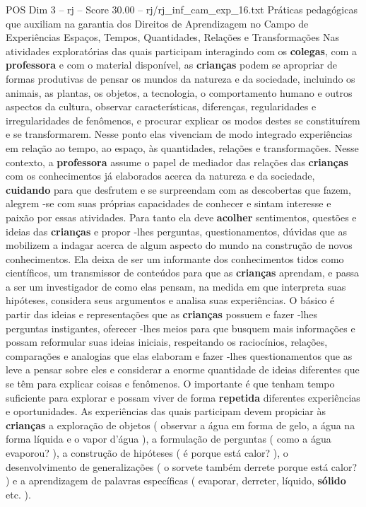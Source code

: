 \begin{textsample}{POS Dim 3 – rj – Score 30.00 – rj/rj\_inf\_cam\_exp\_16.txt}  \label{ex:f3_pos_001}
Práticas pedagógicas que auxiliam na garantia dos Direitos de Aprendizagem no Campo de Experiências Espaços, Tempos, Quantidades, Relações e Transformações Nas atividades exploratórias das quais participam interagindo com os \textbf{colegas}, com a \textbf{professora} e com o material disponível, as \textbf{crianças} podem se apropriar de formas produtivas de pensar os mundos da natureza e da sociedade, incluindo os animais, as plantas, os objetos, a tecnologia, o comportamento humano e outros aspectos da cultura, observar características, diferenças, regularidades e irregularidades de fenômenos, e procurar explicar os modos destes se constituírem e se transformarem.
Nesse ponto elas vivenciam de modo integrado experiências em relação ao tempo, ao espaço, às quantidades, relações e transformações.
Nesse contexto, a \textbf{professora} assume o papel de mediador das relações das \textbf{crianças} com os conhecimentos já elaborados acerca da natureza e da sociedade, \textbf{cuidando} para que desfrutem e se surpreendam com as descobertas que fazem, alegrem -se com suas próprias capacidades de conhecer e sintam interesse e paixão por essas atividades.
Para tanto ela deve \textbf{acolher} sentimentos, questões e ideias das \textbf{crianças} e propor -lhes perguntas, questionamentos, dúvidas que as mobilizem a indagar acerca de algum aspecto do mundo na construção de novos conhecimentos.
Ela deixa de ser um informante dos conhecimentos tidos como científicos, um transmissor de conteúdos para que as \textbf{crianças} aprendam, e passa a ser um investigador de como elas pensam, na medida em que interpreta suas hipóteses, considera seus argumentos e analisa suas experiências.
O básico é partir das ideias e representações que as \textbf{crianças} possuem e fazer -lhes perguntas instigantes, oferecer -lhes meios para que busquem mais informações e possam reformular suas ideias iniciais, respeitando os raciocínios, relações, comparações e analogias que elas elaboram e fazer -lhes questionamentos que as leve a pensar sobre eles e considerar a enorme quantidade de ideias diferentes que se têm para explicar coisas e fenômenos.
O importante é que tenham tempo suficiente para explorar e possam viver de forma \textbf{repetida} diferentes experiências e oportunidades.
As experiências das quais participam devem propiciar às \textbf{crianças} a exploração de objetos ( observar a água em forma de gelo, a água na forma líquida e o vapor d’água ), a formulação de perguntas ( como a água evaporou? ), a construção de hipóteses ( é porque está calor? ), o desenvolvimento de generalizações ( o sorvete também derrete porque está calor? ) e a aprendizagem de palavras específicas ( evaporar, derreter, líquido, \textbf{sólido} etc. ).

\end{textsample}
